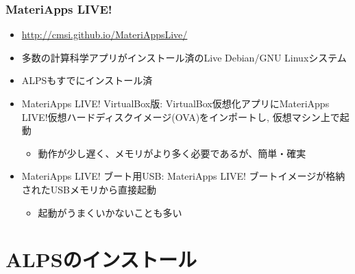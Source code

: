 \begin{frame}
 \frametitle{MateriApps LIVE!}
 \begin{itemize}
   \item \url{http://cmsi.github.io/MateriAppsLive/}
   \item 多数の計算科学アプリがインストール済のLive Debian/GNU Linuxシステム
   \item ALPSもすでにインストール済
   \item MateriApps LIVE! VirtualBox版: VirtualBox仮想化アプリにMateriApps LIVE!仮想ハードディスクイメージ(OVA)をインポートし, 仮想マシン上で起動
     \begin{itemize}
     \item 動作が少し遅く、メモリがより多く必要であるが、簡単・確実
     \end{itemize}
   \item MateriApps LIVE! ブート用USB: MateriApps LIVE! ブートイメージが格納されたUSBメモリから直接起動
     \begin{itemize}
     \item 起動がうまくいかないことも多い
     \end{itemize}
 \end{itemize}
\end{frame}

\section{ALPSのインストール}
\subsection*{\redm\whitem\greenb}

